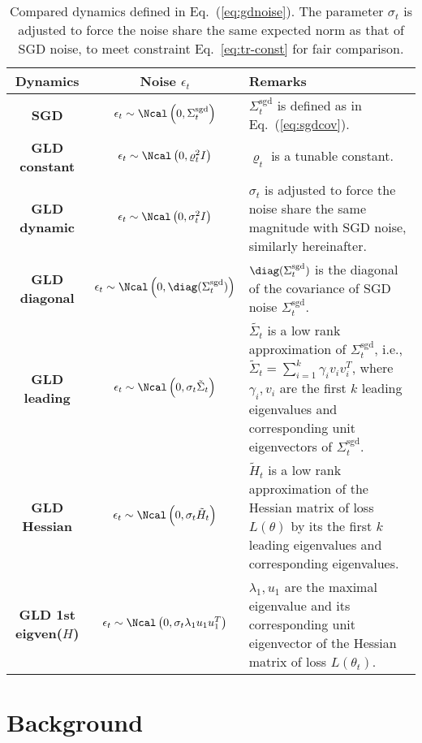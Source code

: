 \documentclass{article}
\begin{document}
\begin{table*}
\centering
\caption{\small Compared dynamics defined in Eq.~(\ref{eq:gdnoise}).
The parameter $\sigma_t$ is adjusted to force the noise share the same expected norm as that of SGD noise, to meet constraint Eq.~\eqref{eq:tr-const} for fair comparison.}
\label{tb:dynamics}
\small
\begin{tabular}{|c|c|p{10cm}|}
\hline
Dynamics & Noise $\epsilon_t$ & Remarks\\ 
\hline
{\bf SGD} & $\epsilon_t \sim \Ncal \left(0, \Sigma^{\text{sgd}}_t\right)$ & $\Sigma^{\text{sgd}}_t$ is defined as in Eq.~(\ref{eq:sgdcov}). \\
\hline
{\bf GLD constant} & $\epsilon_t \sim \Ncal \left(0, \varrho_t^2 I\right)$ & $\varrho_t$ is a tunable constant. \\
\hline
{\bf GLD dynamic} & $\epsilon_t \sim \Ncal \left(0, \sigma_t^2 I\right)$ & $\sigma_t$ is adjusted to force the noise share the same magnitude with SGD noise, similarly hereinafter. \\
\hline
{\bf GLD diagonal} & $\epsilon_t \sim \Ncal \left(0, \diag(\Sigma_t^{\text{sgd}})\right)$ &  $\diag(\Sigma_t^{\text{sgd}})$ is the diagonal of the covariance of SGD noise $\Sigma_t^{\text{sgd}}$. \\
\hline
{\bf GLD leading} & $\epsilon_t \sim \Ncal \left(0, \sigma_t \tilde{\Sigma}_t\right)$ & $\tilde{\Sigma_t}$ is a low rank approximation of $\Sigma^{\text{sgd}}_t$, i.e., $\tilde{\Sigma}_t = \sum_{i=1}^k \gamma_i v_i v_i^T$, where  $\gamma_i, v_i$ are the first $k$ leading eigenvalues and corresponding unit eigenvectors of $\Sigma_t^{\text{sgd}}$. \\
\hline
{\bf GLD Hessian} & $\epsilon_t \sim \Ncal \left(0, \sigma_t \tilde{H}_t\right)$ & $\tilde{H}_t$ is a low rank approximation of the Hessian matrix of loss $L(\theta)$ by its the first $k$ leading eigenvalues and corresponding eigenvalues. \\
\hline
{\bf GLD 1st eigven($H$)} & $\epsilon_t \sim \Ncal \left(0, \sigma_t \lambda_1 u_1 u_1^T\right)$ & $\lambda_1, u_1$ are the maximal eigenvalue and its corresponding unit eigenvector of the Hessian matrix of loss $L(\theta_t)$. \\
\hline
\end{tabular}
\end{table*}

\section{Background}
\label{sec:back}
\end{document}
